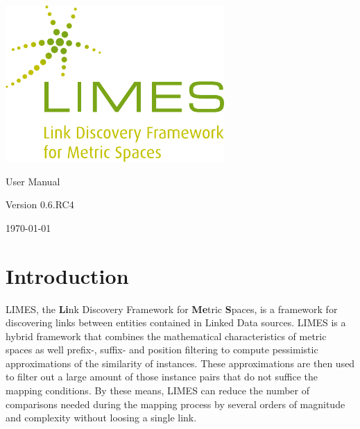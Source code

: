 \documentclass[a4paper, 11pt]{article}
\begin{document}
\thispagestyle{empty}
\begin{titlepage}
\begin{center}
\includegraphics[width=\textwidth]{images/limes_logo.pdf}

\centering
\Huge User Manual

\huge Version 0.6.RC4
	
\vfill
{\large \today}
\end{center}
\end{titlepage}
\tableofcontents

\newpage
\section{Introduction}
LIMES, the \textbf{Li}nk Discovery Framework for \textbf{Me}tric \textbf{S}paces, is a framework for discovering links between entities contained in Linked Data sources. LIMES is a hybrid framework that combines the mathematical characteristics of metric spaces as well prefix-, suffix- and position filtering to compute pessimistic approximations of the similarity of instances. These approximations are then used to filter out a large amount of those instance pairs that do not suffice the mapping conditions. By these means, LIMES can reduce the number of comparisons needed during the mapping process by several orders of magnitude and complexity without loosing a single link.  
\end{document}
